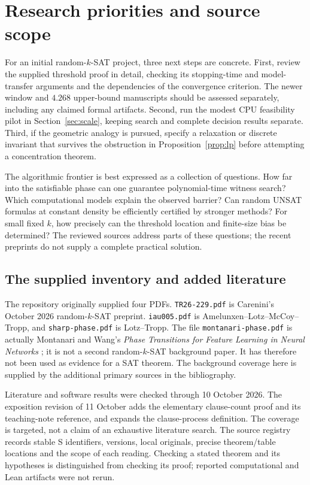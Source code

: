 \section{Research priorities and source scope}
\label{sec:outlook}

For an initial random-$k$-SAT project, three next steps are concrete.
First, review the supplied threshold proof in detail, checking its stopping-time
and model-transfer arguments and the dependencies of the convergence criterion.
The newer window and $4.268$ upper-bound manuscripts should be assessed
separately, including any claimed formal artifacts. Second, run the modest
CPU feasibility pilot in Section~\ref{sec:scale}, keeping search and complete
decision results separate. Third, if the geometric analogy is pursued,
specify a relaxation or discrete invariant that survives the obstruction in
Proposition~\ref{prop:lp} before attempting a concentration theorem.

The algorithmic frontier is best expressed as a collection of questions.
How far into the satisfiable phase can one guarantee polynomial-time witness
search? Which computational models explain the observed barrier? Can random
UNSAT formulas at constant density be efficiently certified by stronger
methods? For small fixed $k$, how precisely can the threshold location and
finite-size bias be determined? The reviewed sources address parts of these
questions; the recent preprints do not supply a complete practical solution.

\subsection{The supplied inventory and added literature}
The repository originally supplied four PDFs. \texttt{TR26-229.pdf} is
Carenini's October 2026 random-$k$-SAT preprint. \texttt{iau005.pdf} is
Amelunxen--Lotz--McCoy--Tropp, and \texttt{sharp-phase.pdf} is Lotz--Tropp.
The file \texttt{montanari-phase.pdf} is actually Montanari and Wang's
\emph{Phase Transitions for Feature Learning in Neural Networks}
\citep{montanari2026}; it is not a second random-$k$-SAT background paper.
It has therefore not been used as evidence for a SAT theorem. The background
coverage here is supplied by the additional primary sources in the bibliography.

Literature and software results were checked through 10 October 2026.
The exposition revision of 11 October adds the elementary clause-count
proof and its teaching-note reference, and expands the clause-process definition.
The coverage is targeted, not a claim of an exhaustive literature search.
The source registry records stable S identifiers, versions, local originals,
precise theorem/table locations and the scope of each reading. Checking a
stated theorem and its hypotheses is distinguished from checking its proof;
reported computational and Lean artifacts were not rerun.

